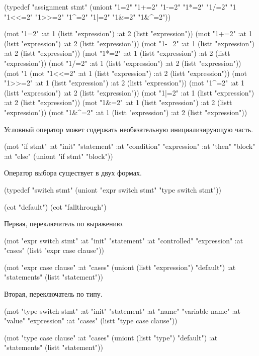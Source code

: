 \documentclass[12pt,twoside,russian]{article}
\begin{document}
\begin{ABMLCode}
(typedef "assignment stmt" 
    (uniont "1=2" "1+=2" "1-=2" "1*=2" "1/=2" "1%
            "1<<=2" "1>>=2" "1^=2" "1|=2" "1&=2" "1&^=2"))

(mot "1=2"   :at 1 (listt "expression") :at 2 (listt "expression"))
(mot "1+=2"  :at 1 (listt "expression") :at 2 (listt "expression"))
(mot "1-=2"  :at 1 (listt "expression") :at 2 (listt "expression"))
(mot "1*=2"  :at 1 (listt "expression") :at 2 (listt "expression"))
(mot "1/=2"  :at 1 (listt "expression") :at 2 (listt "expression"))
(mot "1%
(mot "1<<=2" :at 1 (listt "expression") :at 2 (listt "expression"))
(mot "1>>=2" :at 1 (listt "expression") :at 2 (listt "expression"))
(mot "1^=2"  :at 1 (listt "expression") :at 2 (listt "expression"))
(mot "1|=2"  :at 1 (listt "expression") :at 2 (listt "expression"))
(mot "1&=2"  :at 1 (listt "expression") :at 2 (listt "expression"))
(mot "1&^=2" :at 1 (listt "expression") :at 2 (listt "expression"))
\end{ABMLCode}

Условный оператор может содержать необязательную инициализирующую часть.

\begin{ABMLCode}
(mot "if stmt" 
	:at "init"      "statement"
	:at "condition" "expression" 
	:at "then"      "block" 
	:at "else"      (uniont "if stmt" "block"))
\end{ABMLCode}

Оператор выбора существует в двух формах. 

\begin{ABMLCode}
(typedef "switch stmt" (uniont "expr switch stmt" "type switch stmt"))

(cot "default")
(cot "fallthrough")
\end{ABMLCode}

Первая, переключатель по выражению. 

\begin{ABMLCode}
(mot "expr switch stmt" 
	:at "init"       "statement" 
	:at "controlled" "expression" 
	:at "cases"      (listt "expr case clause"))

(mot "expr case clause" 
	:at "cases"      (uniont (listt "expression") "default") 
	:at "statements" (listt "statement"))
\end{ABMLCode}

Вторая, переключатель по типу. 

\begin{ABMLCode}
(mot "type switch stmt" 
	:at "init"  "statement" 
	:at "name"  "variable name"
	:at "value" "expression" 
	:at "cases" (listt "type case clause"))

(mot "type case clause" 
	:at "cases"      (uniont (listt "type") "default") 
	:at "statements" (listt "statement"))
\end{ABMLCode}
\end{document}
